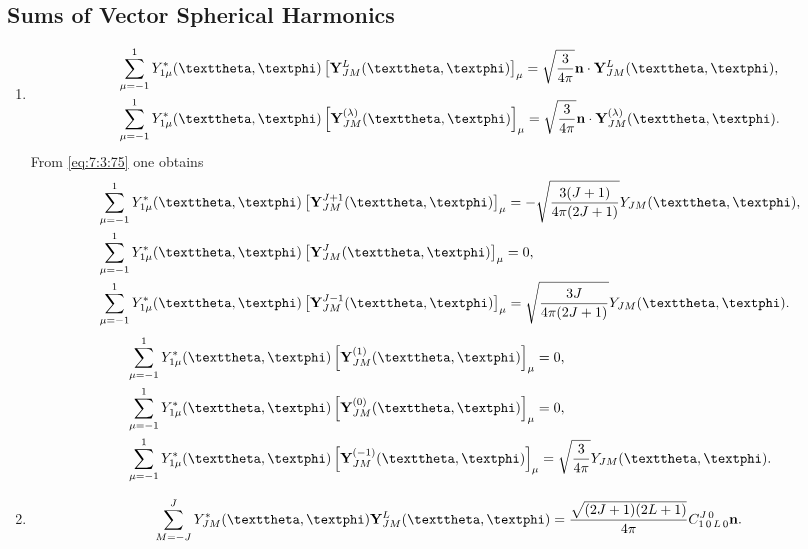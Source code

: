 \subsection{Sums of Vector Spherical Harmonics}\label{sec:7.3.9}
\begin{enumerate}[label=(\alph*)]
\item
\begin{align}
& \sum_{\mu=-1}^{1} Y_{1 \mu}^{*}(\vartheta, \varphi)\left[\vect{Y}_{J M}^{L}(\vartheta, \varphi)\right]_{\mu}=\sqrt{\frac{3}{4 \pi}} \vect{n} \cdot \vect{Y}_{J M}^{L}(\vartheta, \varphi), \notag\\
& \sum_{\mu=-1}^{1} Y_{1 \mu}^{*}(\vartheta, \varphi)\left[\vect{Y}_{J M}^{(\lambda)}(\vartheta, \varphi)\right]_{\mu}=\sqrt{\frac{3}{4 \pi}} \vect{n} \cdot \vect{Y}_{J M}^{(\lambda)}(\vartheta, \varphi). \label{eq:7:3:75}
\end{align}
From \eqref{eq:7:3:75} one obtains
\begin{align}
& \sum_{\mu=-1}^{1} Y_{1 \mu}^{*}(\vartheta, \varphi)\left[\vect{Y}_{J M}^{J+1}(\vartheta, \varphi)\right]_{\mu}=-\sqrt{\frac{3(J+1)}{4 \pi(2 J+1)}} Y_{J M}(\vartheta, \varphi), \notag\\
& \sum_{\mu=-1}^{1} Y_{1 \mu}^{*}(\vartheta, \varphi)\left[\vect{Y}_{J M}^{J}(\vartheta, \varphi)\right]_{\mu}=0, \label{eq:7:3:76}\\
& \sum_{\mu=-1}^{1} Y_{1 \mu}^{*}(\vartheta, \varphi)\left[\vect{Y}_{J M}^{J-1}(\vartheta, \varphi)\right]_{\mu}=\sqrt{\frac{3 J}{4 \pi(2 J+1)}} Y_{J M}(\vartheta, \varphi) . \notag
\end{align}
\begin{align}
& \sum_{\mu=-1}^{1} Y_{1 \mu}^{*}(\vartheta, \varphi)\left[\vect{Y}_{J M}^{(1)}(\vartheta, \varphi)\right]_{\mu}=0, \notag\\
& \sum_{\mu=-1}^{1} Y_{1 \mu}^{*}(\vartheta, \varphi)\left[\vect{Y}_{J M}^{(0)}(\vartheta, \varphi)\right]_{\mu}=0, \label{eq:7:3:77}\\
& \sum_{\mu=-1}^{1} Y_{1 \mu}^{*}(\vartheta, \varphi)\left[\vect{Y}_{J M}^{(-1)}(\vartheta, \varphi)\right]_{\mu}=\sqrt{\frac{3}{4 \pi}} Y_{J M}(\vartheta, \varphi) . \notag
\end{align}
\item
\begin{equation}
\sum_{M=-J}^{J} Y_{J M}^{*}(\vartheta, \varphi) \vect{Y}_{J M}^{L}(\vartheta, \varphi)=\frac{\sqrt{(2 J+1)(2 L+1)}}{4 \pi} \clebsch{1}{0}{L}{0}{J}{0} \vect{n}. \label{eq:7:3:78}

\end{equation}
\end{enumerate}
